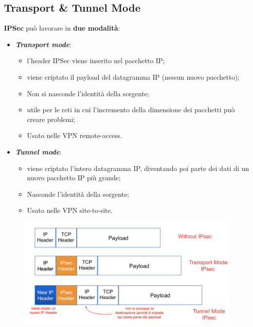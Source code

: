 \documentclass[11pt, a4paper, twoside, italian]{report}
\theoremstyle{plain}
\begin{document}
\subsection*{Transport \& Tunnel Mode}
\textbf{IPSec} può lavorare in \textbf{due modalità}:
\begin{multicols}{2}
\begin{itemize}
	\item \textit{\textbf{Transport mode}}:
		\begin{itemize}
			\item l'header IPSec viene inserito nel pacchetto IP;
			\item viene criptato il payload del datagramma IP (nessun nuovo pacchetto);
			\item Non si  nasconde l'identità della sorgente;
			\item utile per le reti in cui l'incremento della dimensione dei pacchetti può creare problemi;
			\item Usato nelle VPN remote-access.
		\end{itemize}
	\end{itemize}
\columnbreak
	\begin{itemize}
		\item \textit{\textbf{Tunnel mode}}:
		\begin{itemize}
			\item viene criptato l'intero datagramma IP, diventando poi parte dei dati di un nuovo pacchetto IP più grande;
			\item Nasconde l'identità della sorgente;
			\item Usato nelle VPN site-to-site.
		\end{itemize}
	\end{itemize}
\end{multicols}
\begin{figure}[H]
	\centering
	\includegraphics[scale=0.55]{ipsectransporttunnel}
\end{figure}
\end{document}
